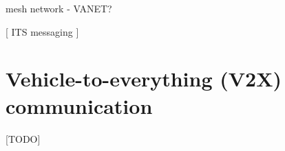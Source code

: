 
mesh network - VANET?















[ ITS messaging ]



\newpage

\section{Vehicle-to-everything (V2X) communication}
\label{sec:v2x}
[TODO]






